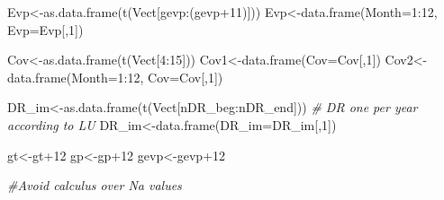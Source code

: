 \documentclass[
  10pt,
  b5paper,
]{book}
\newenvironment{Shaded}{\begin{snugshade}}{\end{snugshade}}
\newcommand{\AttributeTok}[1]{\textcolor[rgb]{0.77,0.63,0.00}{#1}}
\newcommand{\CommentTok}[1]{\textcolor[rgb]{0.56,0.35,0.01}{\textit{#1}}}
\newcommand{\DecValTok}[1]{\textcolor[rgb]{0.00,0.00,0.81}{#1}}
\newcommand{\FunctionTok}[1]{\textcolor[rgb]{0.00,0.00,0.00}{#1}}
\newcommand{\NormalTok}[1]{#1}
\newcommand{\OtherTok}[1]{\textcolor[rgb]{0.56,0.35,0.01}{#1}}
\newcommand{\SpecialCharTok}[1]{\textcolor[rgb]{0.00,0.00,0.00}{#1}}
\begin{document}
\begin{Shaded}
\begin{Highlighting}[]
\NormalTok{Evp}\OtherTok{\textless{}{-}}\FunctionTok{as.data.frame}\NormalTok{(}\FunctionTok{t}\NormalTok{(Vect[gevp}\SpecialCharTok{:}\NormalTok{(gevp}\SpecialCharTok{+}\DecValTok{11}\NormalTok{)]))}
\NormalTok{Evp}\OtherTok{\textless{}{-}}\FunctionTok{data.frame}\NormalTok{(}\AttributeTok{Month=}\DecValTok{1}\SpecialCharTok{:}\DecValTok{12}\NormalTok{, }\AttributeTok{Evp=}\NormalTok{Evp[,}\DecValTok{1}\NormalTok{])}
    
\NormalTok{Cov}\OtherTok{\textless{}{-}}\FunctionTok{as.data.frame}\NormalTok{(}\FunctionTok{t}\NormalTok{(Vect[}\DecValTok{4}\SpecialCharTok{:}\DecValTok{15}\NormalTok{]))}
\NormalTok{Cov1}\OtherTok{\textless{}{-}}\FunctionTok{data.frame}\NormalTok{(}\AttributeTok{Cov=}\NormalTok{Cov[,}\DecValTok{1}\NormalTok{])}
\NormalTok{Cov2}\OtherTok{\textless{}{-}}\FunctionTok{data.frame}\NormalTok{(}\AttributeTok{Month=}\DecValTok{1}\SpecialCharTok{:}\DecValTok{12}\NormalTok{, }\AttributeTok{Cov=}\NormalTok{Cov[,}\DecValTok{1}\NormalTok{])}

\NormalTok{DR\_im}\OtherTok{\textless{}{-}}\FunctionTok{as.data.frame}\NormalTok{(}\FunctionTok{t}\NormalTok{(Vect[nDR\_beg}\SpecialCharTok{:}\NormalTok{nDR\_end])) }\CommentTok{\# DR one per year according to LU}
\NormalTok{DR\_im}\OtherTok{\textless{}{-}}\FunctionTok{data.frame}\NormalTok{(}\AttributeTok{DR\_im=}\NormalTok{DR\_im[,}\DecValTok{1}\NormalTok{])}

\NormalTok{gt}\OtherTok{\textless{}{-}}\NormalTok{gt}\SpecialCharTok{+}\DecValTok{12}
\NormalTok{gp}\OtherTok{\textless{}{-}}\NormalTok{gp}\SpecialCharTok{+}\DecValTok{12}
\NormalTok{gevp}\OtherTok{\textless{}{-}}\NormalTok{gevp}\SpecialCharTok{+}\DecValTok{12}

\CommentTok{\#Avoid calculus over Na values }


\end{Highlighting}
\end{Shaded}
\end{document}

